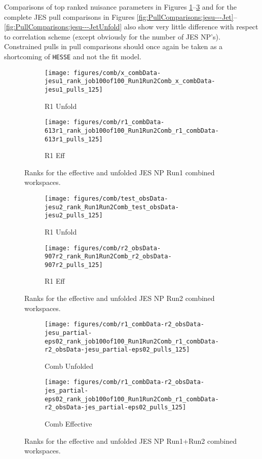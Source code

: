 Comparisons of top ranked nuisance parameters in Figures \ref{fig:Ranks:jesu1}--\ref{fig:Ranks:jesuc} and for the complete JES pull comparisons in Figures \ref{fig:PullComparisons:jesu---Jet}--\ref{fig:PullComparisons:jesu---JetUnfold} also show very little difference with respect to correlation scheme (except obviously for the number of JES NP's).  Constrained pulls in pull comparisons should once again be taken as a shortcoming of \texttt{HESSE} and not the fit model.
\begin{figure}[!htbp]\captionsetup{justification=centering}
  \centering
\begin{subfigure}[t]{0.45000\textwidth}\centering\texttt{[image: figures/comb/x\_combData-jesu1\_rank\_job100of100\_Run1Run2Comb\_x\_combData-jesu1\_pulls\_125]}\caption{R1 Unfold}\end{subfigure}
\begin{subfigure}[t]{0.45000\textwidth}\centering\texttt{[image: figures/comb/r1\_combData-613r1\_rank\_job100of100\_Run1Run2Comb\_r1\_combData-613r1\_pulls\_125]}\caption{R1 Eff}\end{subfigure}
  \caption{Ranks for the effective and unfolded JES NP Run1 combined workspaces.}
    \label{fig:Ranks:jesu1}
\end{figure}

\begin{figure}[!htbp]\captionsetup{justification=centering}
  \centering
\begin{subfigure}[t]{0.45000\textwidth}\centering\texttt{[image: figures/comb/test\_obsData-jesu2\_rank\_Run1Run2Comb\_test\_obsData-jesu2\_pulls\_125]}\caption{R1 Unfold}\end{subfigure}
\begin{subfigure}[t]{0.45000\textwidth}\centering\texttt{[image: figures/comb/r2\_obsData-907r2\_rank\_Run1Run2Comb\_r2\_obsData-907r2\_pulls\_125]}\caption{R1 Eff}\end{subfigure}
  \caption{Ranks for the effective and unfolded JES NP Run2 combined workspaces.}
    \label{fig:Ranks:jesu2}
\end{figure}

\begin{figure}[!htbp]\captionsetup{justification=centering}
  \centering
\begin{subfigure}[t]{0.45\textwidth}\centering\texttt{[image: figures/comb/r1\_combData-r2\_obsData-jesu\_partial-eps02\_rank\_job100of100\_Run1Run2Comb\_r1\_combData-r2\_obsData-jesu\_partial-eps02\_pulls\_125]}\caption{Comb Unfolded}\end{subfigure}
\begin{subfigure}[t]{0.45\textwidth}\centering\texttt{[image: figures/comb/r1\_combData-r2\_obsData-jes\_partial-eps02\_rank\_job100of100\_Run1Run2Comb\_r1\_combData-r2\_obsData-jes\_partial-eps02\_pulls\_125]}\caption{Comb Effective}\end{subfigure}
  \caption{Ranks for the effective and unfolded JES NP Run1+Run2 combined workspaces.}
    \label{fig:Ranks:jesuc}
\end{figure}

